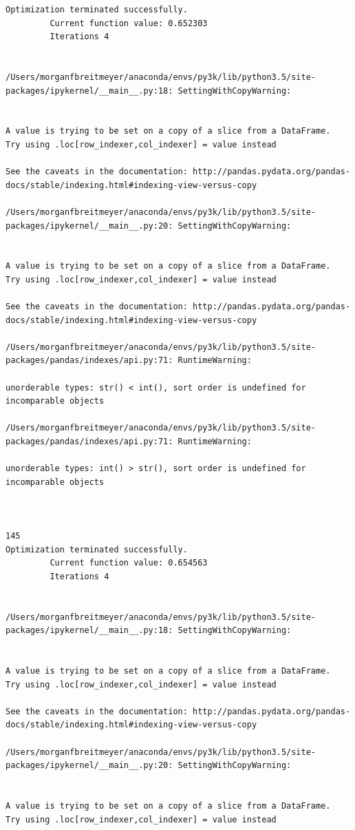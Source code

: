 \begin{lstlisting}
Optimization terminated successfully.
         Current function value: 0.652303
         Iterations 4


/Users/morganfbreitmeyer/anaconda/envs/py3k/lib/python3.5/site-packages/ipykernel/__main__.py:18: SettingWithCopyWarning:


A value is trying to be set on a copy of a slice from a DataFrame.
Try using .loc[row_indexer,col_indexer] = value instead

See the caveats in the documentation: http://pandas.pydata.org/pandas-docs/stable/indexing.html#indexing-view-versus-copy

/Users/morganfbreitmeyer/anaconda/envs/py3k/lib/python3.5/site-packages/ipykernel/__main__.py:20: SettingWithCopyWarning:


A value is trying to be set on a copy of a slice from a DataFrame.
Try using .loc[row_indexer,col_indexer] = value instead

See the caveats in the documentation: http://pandas.pydata.org/pandas-docs/stable/indexing.html#indexing-view-versus-copy

/Users/morganfbreitmeyer/anaconda/envs/py3k/lib/python3.5/site-packages/pandas/indexes/api.py:71: RuntimeWarning:

unorderable types: str() < int(), sort order is undefined for incomparable objects

/Users/morganfbreitmeyer/anaconda/envs/py3k/lib/python3.5/site-packages/pandas/indexes/api.py:71: RuntimeWarning:

unorderable types: int() > str(), sort order is undefined for incomparable objects



145
Optimization terminated successfully.
         Current function value: 0.654563
         Iterations 4


/Users/morganfbreitmeyer/anaconda/envs/py3k/lib/python3.5/site-packages/ipykernel/__main__.py:18: SettingWithCopyWarning:


A value is trying to be set on a copy of a slice from a DataFrame.
Try using .loc[row_indexer,col_indexer] = value instead

See the caveats in the documentation: http://pandas.pydata.org/pandas-docs/stable/indexing.html#indexing-view-versus-copy

/Users/morganfbreitmeyer/anaconda/envs/py3k/lib/python3.5/site-packages/ipykernel/__main__.py:20: SettingWithCopyWarning:


A value is trying to be set on a copy of a slice from a DataFrame.
Try using .loc[row_indexer,col_indexer] = value instead


\end{lstlisting}
